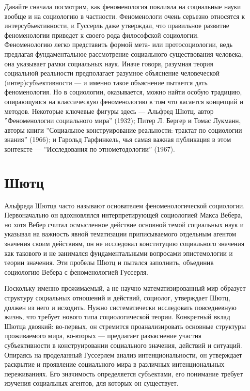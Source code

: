 \documentclass[11pt]{book}
\begin{document}
Давайте сначала посмотрим, как феноменология повлияла на социальные науки вообще и на социологию в частности. Феноменологи очень серьезно относятся к интерсубъективности, и Гуссерль даже утверждал, что правильное развитие феноменологии приведет к своего рода философской социологии. Феноменологию легко представить формой мета- или протосоциологии, ведь предлагая фундаментальное рассмотрение социального существования человека, она указывает рамки социальных наук. Иначе говоря, разумная теория социальной реальности предполагает разумное объяснение человеческой (интер)субъективности --- и именно такое объяснение пытается дать феноменология. Но в социологии, оказывается, можно найти особую традицию, опирающуюся на классическую феноменологию в том что касается концепций и методов. Некоторые ключевые фигуры здесь --- Альфред Шютц, автор ''Феноменологии социального мира'' (1932); Питер Л. Бергер и Томас Лукманн, авторы книги ''Социальное конструирование реальности: трактат по социологии знания'' (1966); и Гарольд Гарфинкель, чья самая важная публикация в этом контексте --- ''Исследования по этнометодологии'' (1967).

\section{Шютц}

Альфреда Шютца часто называют основателем феноменологической социологии. Первоначально он вдохновлялся интерпретирующей социологией Макса Вебера, но хотя Вебер считал осмысленное действие основной темой социальных наук и указывал на важность явной тематизации приписываемого отдельным агентом значения своим действиям, он не исследовал конституцию социального значения как такового и не занимался фундаментальными вопросами эпистемологии и теории значения. Эти пробелы Шютц и пытался заполнить, объединив социологию Вебера с феноменологией Гуссерля.

Поскольку именно прожимаемый, а не научно-математизированный мир образует структуру социальных отношений и действий, социолог, утверждает Шютц, должен из него и исходить. Нужно систематически исследовать повседневную жизнь, что требует нового типа социологической теории. Конкретный вклад Шютца двоякий: во-первых, он стремится проанализировать основные структуры проживаемого мира, во-вторых --- предлагает разъяснение участия субъективности в конструировании социального значения, действий и ситуаций. Опираясь на проделанный Гуссерлем анализ интенциональности, он утверждает раскрытие и проявление социального мира в различных интенциональных переживаниях. Его значимость определяется субъектами, его понимание требует изучения социальных агентов, для которых он существует.
\end{document}
